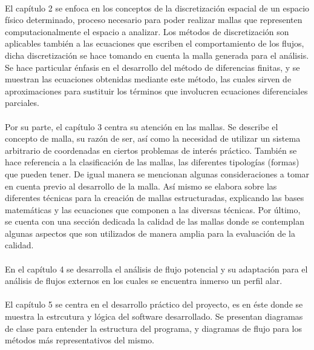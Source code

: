 \documentclass[letterpaper, openright, 12pt]{book}
\begin{document}
    \paragraph*{}
    El capítulo 2 se enfoca en los conceptos de la discretización espacial de
    un espacio físico determinado, proceso necesario para poder realizar
    mallas que representen computacionalmente el espacio a analizar. Los
    métodos de discretización son aplicables también a las ecuaciones que
    escriben el comportamiento de los flujos, dicha discretización se hace
    tomando en cuenta la malla generada para el análisis. Se hace particular
    énfasis en el desarrollo del método de diferencias finitas, y se muestran
    las ecuaciones obtenidas mediante este método, las cuales sirven de
    aproximaciones para sustituir los términos que involucren ecuaciones
    diferenciales parciales.

    \paragraph*{}
    Por su parte, el capítulo 3 centra su atención en las mallas. Se describe
    el concepto de malla, su razón de ser, así como la necesidad de utilizar un
    sistema arbitrario de coordenadas en ciertos problemas de interés práctico.
    También se hace referencia a la clasificación de las mallas, las diferentes
    tipologías (formas) que pueden tener. De igual manera se mencionan algunas
    consideraciones a tomar en cuenta previo al desarrollo de la malla. Así
    mismo se elabora sobre las diferentes técnicas para la creación de mallas
    estructuradas, explicando las bases matemáticas y las ecuaciones que
    componen a las diversas técnicas. Por último, se cuenta con una sección
    dedicada la calidad de las mallas donde se contemplan algunas aspectos que
    son utilizados de manera amplia para la evaluación de la calidad.

    \paragraph*{}
    En el capítulo 4 se desarrolla el análisis de flujo potencial y su
    adaptación para el análisis de flujos externos en los cuales se encuentra
    inmerso un perfil alar.

    \paragraph*{}
    El capítulo 5 se centra en el desarrollo práctico del proyecto, es en éste
    donde se muestra la estrcutura y lógica del software desarrollado. Se
    presentan diagramas de clase para entender la estructura del programa, y
    diagramas de flujo para los métodos más representativos del mismo.
\end{document}

